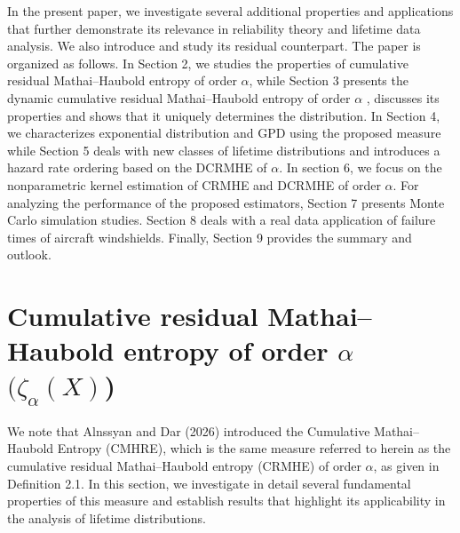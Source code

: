 \documentclass[11pt,reqno]{amsart}
\theoremstyle{tight}
\begin{document}
In the present paper, we
investigate several additional properties and applications that further demonstrate its relevance in reliability theory and lifetime data analysis. We also introduce and study its residual counterpart.
The paper is organized as follows. In Section 2, we studies the properties of  cumulative residual Mathai--Haubold entropy of order $\alpha$, while Section 3 presents the dynamic cumulative residual Mathai–Haubold entropy  of order $\alpha$ , discusses its properties and shows that it uniquely determines the distribution. In Section 4, we characterizes exponential distribution and GPD  using the proposed measure while Section 5 deals with new classes of lifetime distributions and introduces a hazard rate ordering based on the DCRMHE of $\alpha$. In section 6, we focus on the nonparametric kernel estimation of CRMHE and DCRMHE of order $\alpha$. For analyzing the performance of the proposed estimators, Section 7 presents Monte Carlo simulation studies. Section 8 deals with a real data application of failure times of aircraft windshields. Finally, Section 9 provides the summary and outlook.
\par
\section{Cumulative residual  Mathai--Haubold  entropy of order $\alpha$ \((\zeta_{\alpha}(X)\))
}

We note that Alnssyan and Dar (2026) introduced the Cumulative Mathai--Haubold Entropy (CMHRE), which is the same measure referred to herein as the cumulative residual Mathai--Haubold entropy (CRMHE) of order $\alpha$, as given in Definition 2.1. In this section, we investigate in detail several fundamental properties of this measure and establish results that highlight its applicability in the analysis of lifetime distributions.
\end{document}
